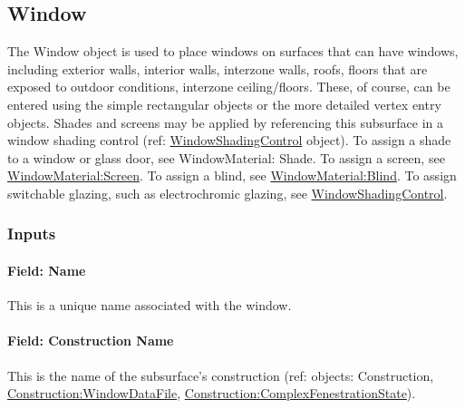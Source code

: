 \subsection{Window}\label{window}

The Window object is used to place windows on surfaces that can have windows, including exterior walls, interior walls, interzone walls, roofs, floors that are exposed to outdoor conditions, interzone ceiling/floors. These, of course, can be entered using the simple rectangular objects or the more detailed vertex entry objects. Shades and screens may be applied by referencing this subsurface in a window shading control (ref: \hyperref[windowpropertyshadingcontrol]{WindowShadingControl} object). To assign a shade to a window or glass door, see WindowMaterial: Shade. To assign a screen, see \hyperref[windowmaterialscreen]{WindowMaterial:Screen}. To assign a blind, see \hyperref[windowmaterialblind]{WindowMaterial:Blind}. To assign switchable glazing, such as electrochromic glazing, see \hyperref[windowpropertyshadingcontrol]{WindowShadingControl}.


\subsubsection{Inputs}\label{inputs-14-016}

\paragraph{Field: Name}\label{field-name-10-018}

This is a unique name associated with the window.

\paragraph{Field: Construction Name}\label{field-construction-name-10}

This is the name of the subsurface's construction (ref: objects: Construction, \hyperref[constructionwindowdatafile]{Construction:WindowDataFile}, \hyperref[constructioncomplexfenestrationstate]{Construction:ComplexFenestrationState}).

